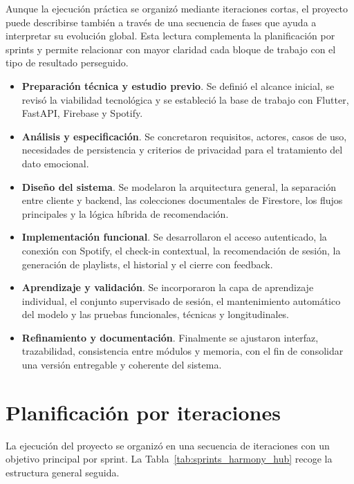 Aunque la ejecución práctica se organizó mediante iteraciones cortas, el
proyecto puede describirse también a través de una secuencia de fases que ayuda
a interpretar su evolución global. Esta lectura complementa la planificación
por sprints y permite relacionar con mayor claridad cada bloque de trabajo con
el tipo de resultado perseguido.

\begin{itemize}
    \item \textbf{Preparación técnica y estudio previo}. Se definió el alcance inicial, se revisó la viabilidad tecnológica y se estableció la base de trabajo con Flutter, FastAPI, Firebase y Spotify.
    \item \textbf{Análisis y especificación}. Se concretaron requisitos, actores, casos de uso, necesidades de persistencia y criterios de privacidad para el tratamiento del dato emocional.
    \item \textbf{Diseño del sistema}. Se modelaron la arquitectura general, la separación entre cliente y backend, las colecciones documentales de Firestore, los flujos principales y la lógica híbrida de recomendación.
    \item \textbf{Implementación funcional}. Se desarrollaron el acceso autenticado, la conexión con Spotify, el check-in contextual, la recomendación de sesión, la generación de playlists, el historial y el cierre con feedback.
    \item \textbf{Aprendizaje y validación}. Se incorporaron la capa de aprendizaje individual, el conjunto supervisado de sesión, el mantenimiento automático del modelo y las pruebas funcionales, técnicas y longitudinales.
    \item \textbf{Refinamiento y documentación}. Finalmente se ajustaron interfaz, trazabilidad, consistencia entre módulos y memoria, con el fin de consolidar una versión entregable y coherente del sistema.
\end{itemize}

\section{Planificación por iteraciones}
\label{sec:planificacion_iteraciones}

La ejecución del proyecto se organizó en una secuencia de iteraciones con un
objetivo principal por sprint. La Tabla~\ref{tab:sprints_harmony_hub} recoge la
estructura general seguida.

